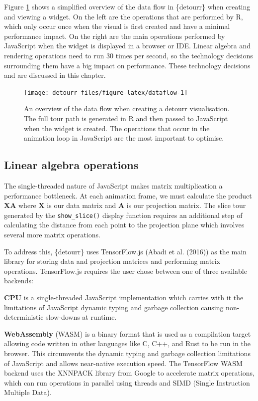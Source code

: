 Figure \ref{fig:dataflow} shows a simplified overview of the data flow in \{detourr\} when creating and viewing a widget. On the left are the operations that are performed by R, which only occur once when the visual is first created and have a minimal performance impact. On the right are the main operations performed by JavaScript when the widget is displayed in a browser or IDE. Linear algebra and rendering operations need to run 30 times per second, so the technology decisions surrounding them have a big impact on performance. These technology decisions and are discussed in this chapter.

\begin{figure}
\texttt{[image: detourr\_files/figure-latex/dataflow-1]} \caption{An overview of the data flow when creating a detourr visualisation. The full tour path is generated in R and then passed to JavaScript when the widget is created. The operations that occur in the animation loop in JavaScript are the most important to optimise.}\label{fig:dataflow}
\end{figure}

\hypertarget{linear-algebra-operations}{%
\subsection{Linear algebra operations}\label{linear-algebra-operations}}

The single-threaded nature of JavaScript makes matrix multiplication a performance bottleneck. At each animation frame, we must calculate the product \(\mathbf{XA}\) where \(\mathbf{X}\) is our data matrix and \(\mathbf{A}\) is our projection matrix. The slice tour generated by the \texttt{show\_slice()} display function requires an additional step of calculating the distance from each point to the projection plane which involves several more matrix operations.

To address this, \{detourr\} uses TensorFlow.js (Abadi et al. (2016)) as the main library for storing data and projection matrices and performing matrix operations. TensorFlow.js requires the user chose between one of three available backends:

\textbf{CPU} is a single-threaded JavaScript implementation which carries with it the limitations of JavaScript dynamic typing and garbage collection causing non-deterministic slow-downs at runtime.

\textbf{WebAssembly} (WASM) is a binary format that is used as a compilation target allowing code written in other languages like C, C++, and Rust to be run in the browser. This circumvents the dynamic typing and garbage collection limitations of JavaScript and allows near-native execution speed. The TensorFlow WASM backend uses the XNNPACK library from Google to accelerate matrix operations, which can run operations in parallel using threads and SIMD (Single Instruction Multiple Data).

